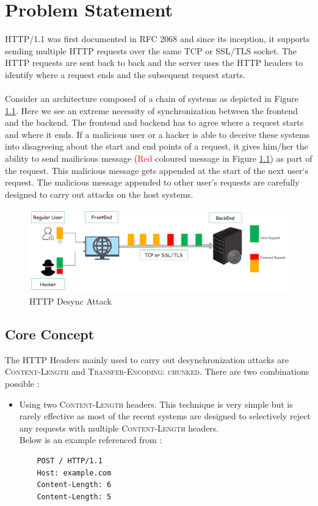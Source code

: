 \chapter{Problem Statement}
HTTP/1.1 was first documented in RFC 2068 \cite{b9} and since its inception, it supports sending multiple HTTP requests over the same TCP or SSL/TLS socket. The HTTP requests are sent back to back and the server uses the HTTP headers to identify where a request ends and the subsequent request starts. \\\\

Consider an architecture composed of a chain of systems as depicted in Figure \ref{fig:HTTP Desync Attack}. Here we see an extreme necessity of synchronization between the frontend and the backend. The frontend and backend has to agree where a request starts and where it ends. If a malicious user or a hacker is able to deceive these systems into disagreeing about the start and end points of a request, it gives him/her the ability to send mailicious message (\textcolor{red}{Red} coloured message in Figure \ref{fig:HTTP Desync Attack}) as part of the request. This malicious message gets appended at the start of the next user`s request. The malicious message appended to other user's requests are carefully designed to carry out attacks on the host systems. 

\begin{figure}
	\includegraphics[width=14cm]{images/HTTP_Desync}
	\caption{HTTP Desync Attack}
	\label{fig:HTTP Desync Attack}
\end{figure}

\section{Core Concept}
The HTTP Headers mainly used to carry out desynchronization attacks are \textsc{Content-Length} and \textsc{Transfer-Encoding: chunked}. There are two combinations possible : 
\begin{itemize}
	\item Using two \textsc{Content-Length} headers. This technique is very simple but is rarely effective as most of the recent systems are designed to selectively reject any requests with multiple \textsc{Content-Length} headers.\\
	Below is an example referenced from \cite{b6}:
	\begin{verbatim}
	POST / HTTP/1.1
	Host: example.com
	Content-Length: 6
	Content-Length: 5
	\end{verbatim}
\end{itemize}